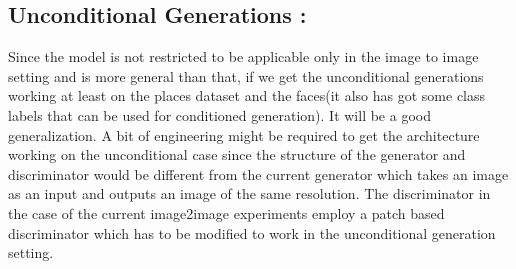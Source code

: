 \subsection{Unconditional Generations :}
Since the model is not restricted to be applicable only in the image to image setting and is more general than that, if we get the unconditional generations working at least on the places dataset and the faces(it also has got some class labels that can be used for conditioned generation). It will be a good generalization. A bit of engineering might be required to get the architecture working on the unconditional case since the structure of the generator and discriminator would be different from the current generator which takes an image as an input and outputs an image of the same resolution. The discriminator in the case of the current image2image experiments employ a patch based discriminator which has to be modified to work in the unconditional generation setting.








